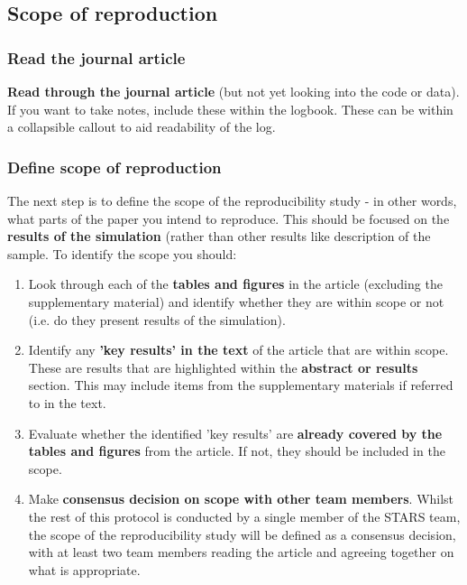 \vspace{0.5cm}
\subsection{Scope of reproduction}

\subsubsection{Read the journal article}

\textbf{Read through the journal article} (but not yet looking into the code or data). If you want to take notes, include these within the logbook. These can be within a collapsible callout to aid readability of the log.

\vspace{0.5cm}
\subsubsection{Define scope of reproduction}

The next step is to define the scope of the reproducibility study - in other words, what parts of the paper you intend to reproduce. This should be focused on the \textbf{results of the simulation} (rather than other results like description of the sample. To identify the scope you should:

\begin{enumerate}
    \item Look through each of the \textbf{tables and figures} in the article (excluding the supplementary material) and identify whether they are within scope or not (i.e. do they present results of the simulation).
    \item Identify any \textbf{'key results' in the text} of the article that are within scope. These are results that are highlighted within the \textbf{abstract or results} section. This may include items from the supplementary materials if referred to in the text.
    \item Evaluate whether the identified 'key results' are \textbf{already covered by the tables and figures} from the article. If not, they should be included in the scope.
    \item Make \textbf{consensus decision on scope with other team members}. Whilst the rest of this protocol is conducted by a single member of the STARS team, the scope of the reproducibility study will be defined as a consensus decision, with at least two team members reading the article and agreeing together on what is appropriate.
\end{enumerate}

